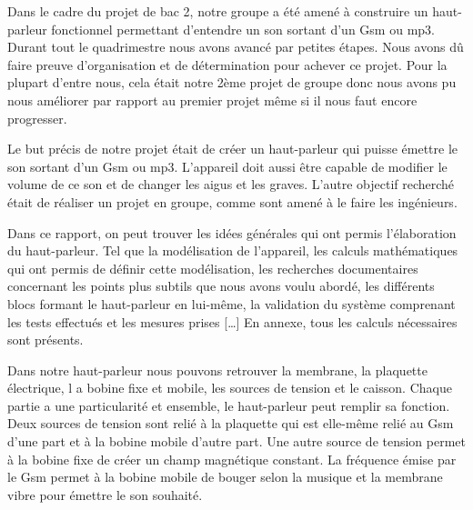 

Dans le cadre du projet de bac 2, notre groupe a été amené à 
construire un haut-parleur fonctionnel permettant d’entendre 
un son sortant d’un Gsm ou mp3.  Durant tout le quadrimestre 
nous avons avancé par petites étapes.  Nous avons dû faire preuve 
d’organisation et de détermination pour achever ce projet.  
Pour la plupart d’entre nous, cela était notre 2ème projet de 
groupe donc nous avons pu nous améliorer par rapport au premier 
projet même si il nous faut encore progresser. 

Le but précis de notre projet était de créer un haut-parleur qui 
puisse émettre le son sortant d’un Gsm ou mp3.  L’appareil doit 
aussi être capable de modifier le volume de ce son et de changer 
les aigus et les graves.  L’autre objectif recherché était de
réaliser un projet en groupe, comme sont amené à le faire les ingénieurs.  

Dans ce rapport, on peut trouver les idées générales qui ont permis
l’élaboration du haut-parleur.  Tel que la modélisation de l’appareil,
les calculs mathématiques qui ont permis de définir cette modélisation, 
les recherches documentaires concernant les points plus subtils que nous 
avons voulu abordé, les différents blocs formant le haut-parleur en 
lui-même, la validation du système comprenant les tests effectués et 
les mesures prises […]  En annexe, tous les calculs nécessaires sont présents.

Dans notre haut-parleur nous pouvons retrouver la membrane, la plaquette électrique, l
a bobine fixe et mobile, les sources de tension et le caisson.  Chaque partie a 
une particularité et ensemble, le haut-parleur peut remplir sa fonction.  Deux sources
de tension sont relié à la plaquette qui est elle-même relié au Gsm d’une part et à 
la bobine mobile d’autre part.  Une autre source de tension permet à la bobine fixe de 
créer un champ magnétique constant.  La fréquence émise par le Gsm permet à la bobine 
mobile de bouger selon la musique et la membrane vibre pour émettre le son souhaité.


